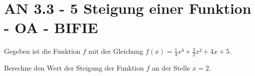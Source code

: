 \section{AN 3.3 - 5 Steigung einer Funktion - OA - BIFIE}

\begin{beispiel}[AN 3.3]{1} %
				Gegeben ist die Funktion $f$ mit der Gleichung $f(x)=\frac{1}{4}x³+\frac{3}{2}x²+4x+5$.

Berechne den Wert der Steigung der Funktion $f$ an der Stelle $x=2$.
\leer

\end{beispiel}